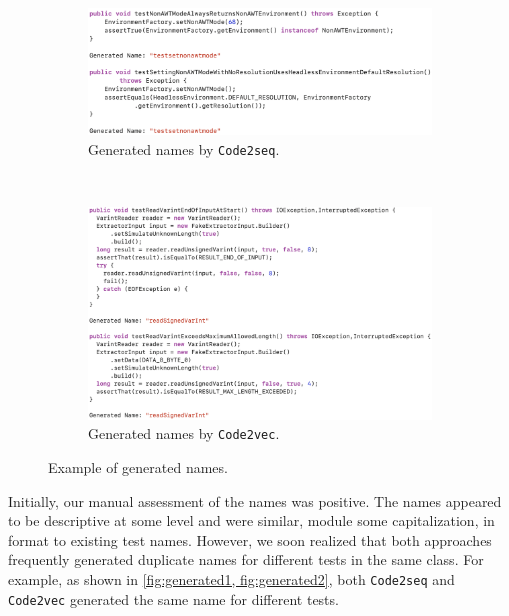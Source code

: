 \begin{appendices}
\begin{figure}[H]
\centering
\begin{subfigure}[b]{1.0\textwidth}
\centering
\includegraphics[scale=0.4]{figures/dup1.png}
\caption{Generated names by \texttt{Code2seq}.}
\label{fig:generated1}
\end{subfigure}\\
\vspace{0.2cm}
\begin{subfigure}[b]{1.0\textwidth}
\centering
\includegraphics[scale=0.4]{figures/dup2.png}
\caption{Generated names by \texttt{Code2vec}.}
\label{fig:generated2}
\end{subfigure}
\caption{Example of generated names.}
\label{fig:duplicate-names}
\end{figure}


Initially, our manual assessment of the names was positive.
%
The names appeared to be descriptive at some level and were similar, module some capitalization, in format to existing test names.
%
However, we soon realized that both approaches frequently generated duplicate names for different tests in the same class.
%
For example, as shown in \cref{fig:generated1, fig:generated2}, both \texttt{Code2seq} and \texttt{Code2vec} generated the same name for different tests.



\end{appendices}
